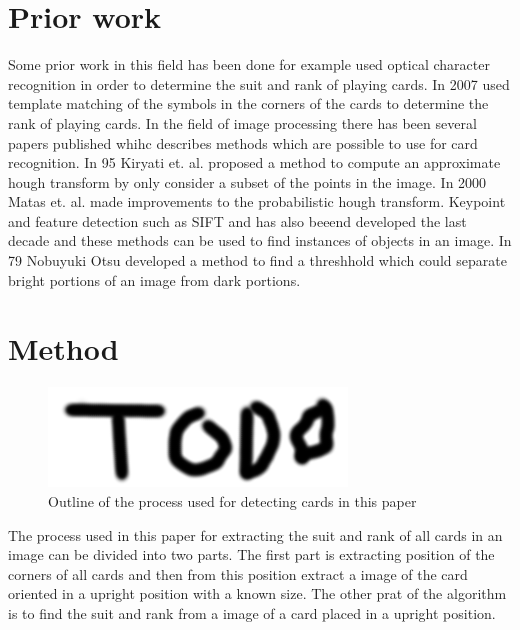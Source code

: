 \documentclass[journal,twoside]{IEEEtran}
\begin{document}

\section{Prior work}

Some prior work in this field has been done for example \cite{PokerVision} used optical character recognition in order to determine the  suit and rank of playing cards. In 2007 \cite{CardRec} used template matching of the symbols in the corners of the cards to determine the rank of playing cards.
In the field of image processing there has been several papers published whihc describes methods which are possible to use for card recognition. In 95 Kiryati et. al. proposed a method to compute an approximate hough transform by only consider a subset of the points in the image\cite{HoughProb}. In 2000 Matas et. al. made improvements to the probabilistic hough transform\cite{HoughP}.
Keypoint and feature detection such as SIFT \cite{SIFT} and \cite{ORB} has also beeend developed the last decade and these methods can be used to find instances of objects in an image. In 79 Nobuyuki Otsu developed a method to find a threshhold which could separate bright portions of an image from dark portions\cite{OTSU}.



\section{Method}

\begin{figure}[placement h]
\centering
\includegraphics[scale=0.4, trim= 0cm 0cm 0cm 0cm]{TODO.png}
\caption{Outline of the process used for detecting cards in this paper}
\label{fig:AlgOutline}
\end{figure}

The process used in this paper for extracting the suit and rank of all cards in an image can be divided into two parts. The first part is extracting position of the corners of all cards and then from this position extract a image of the card oriented in a upright position with a known size. The other prat of the algorithm is to find the suit and rank from a image of a card placed in a upright position.
\end{document}
